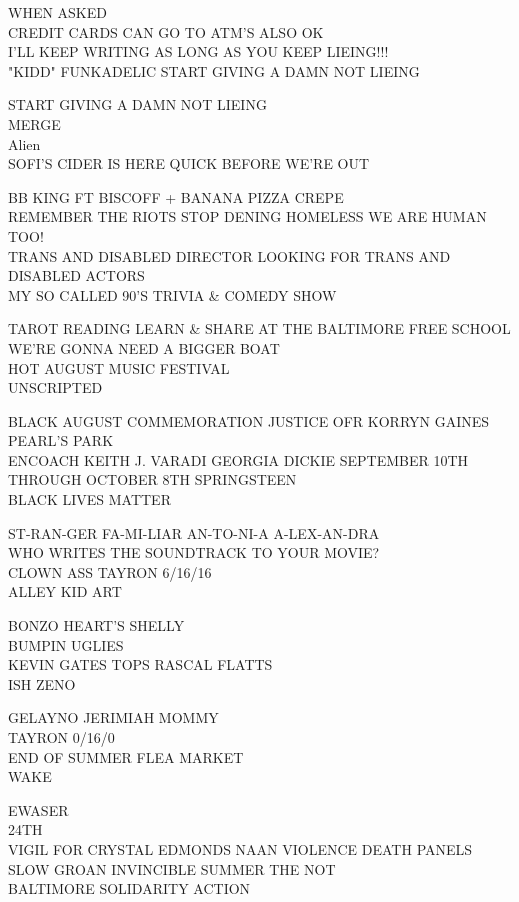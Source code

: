 \documentclass[10pt,letterpaper]{article}
\begin{document}
WHEN ASKED\\
CREDIT CARDS CAN GO TO ATM'S ALSO OK\\
I'LL KEEP WRITING AS LONG AS YOU KEEP LIEING!!!\\
"KIDD" FUNKADELIC START GIVING A DAMN NOT LIEING

START GIVING A DAMN NOT LIEING\\
MERGE\\
Alien\\
SOFI'S CIDER IS HERE QUICK BEFORE WE'RE OUT

BB KING FT BISCOFF + BANANA PIZZA CREPE\\
REMEMBER THE RIOTS STOP DENING HOMELESS WE ARE HUMAN TOO!\\
TRANS AND DISABLED DIRECTOR LOOKING FOR TRANS AND DISABLED ACTORS\\
MY SO CALLED 90'S TRIVIA \& COMEDY SHOW

TAROT READING LEARN \& SHARE AT THE BALTIMORE FREE SCHOOL\\
WE'RE GONNA NEED A BIGGER BOAT\\
HOT AUGUST MUSIC FESTIVAL\\
UNSCRIPTED

BLACK AUGUST COMMEMORATION JUSTICE OFR KORRYN GAINES\\
PEARL'S PARK\\
ENCOACH KEITH J. VARADI GEORGIA DICKIE SEPTEMBER 10TH THROUGH OCTOBER 8TH SPRINGSTEEN\\
BLACK LIVES MATTER

ST{-}RAN{-}GER FA{-}MI{-}LIAR AN{-}TO{-}NI{-}A A{-}LEX{-}AN{-}DRA\\
WHO WRITES THE SOUNDTRACK TO YOUR MOVIE?\\
CLOWN ASS TAYRON 6/16/16\\
ALLEY KID ART

BONZO HEART'S SHELLY\\
BUMPIN UGLIES\\
KEVIN GATES TOPS RASCAL FLATTS\\
ISH ZENO

GELAYNO JERIMIAH MOMMY\\
TAYRON 0/16/0\\
END OF SUMMER FLEA MARKET\\
WAKE

EWASER\\
24TH\\
VIGIL FOR CRYSTAL EDMONDS NAAN VIOLENCE DEATH PANELS SLOW GROAN INVINCIBLE SUMMER THE NOT\\
BALTIMORE SOLIDARITY ACTION
\end{document}
